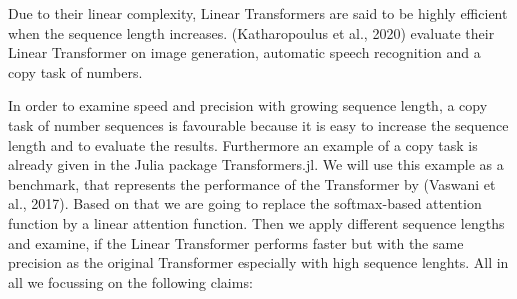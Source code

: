 \documentclass[DIV=13,fontsize=11pt]{scrartcl}
\begin{document}
    


Due to their linear complexity, Linear Transformers are said to be highly efficient when the sequence length increases. (Katharopoulus et al., 2020) evaluate their Linear Transformer on image generation, automatic speech recognition and a copy task of numbers.

 In order to examine speed and precision with growing sequence length, a copy task of number sequences is favourable because it is easy to increase the sequence length and to evaluate the results. Furthermore an example of a copy task is already given in the Julia package Transformers.jl. We will use this example as a benchmark, that represents the performance of the Transformer by (Vaswani et al., 2017). Based on that we are going to replace the softmax-based attention function by a linear attention function. Then we apply different sequence lengths and examine, if the Linear Transformer performs faster but with the same precision as the original Transformer especially with high sequence lenghts. 
All in all we focussing on the following claims:
\end{document}
